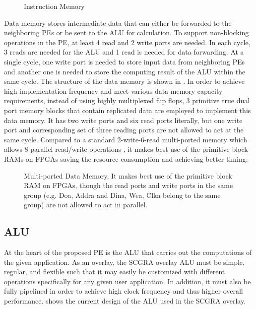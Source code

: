 \begin{figure}
\caption{Instruction Memory}
\label{fig:inst-rom}
\end{figure}

Data memory stores intermediate data that can either be forwarded to the neighboring PEs or be sent to the ALU for calculation. To support non-blocking operations in the PE, at least 4 read and 2 write ports are needed. In each cycle, 3 reads are needed for the ALU and 1 read is needed for data forwarding. At a single cycle, one write port is needed to store input data from neighboring PEs and another one is needed to store the computing result of the ALU within the same cycle. The structure of the data memory is shown in . In order to achieve high implementation frequency and meet various data memory capacity requirements, instead of using highly multiplexed flip flops, 3 primitive true dual port memory blocks that contain replicated data are employed to implement this data memory. It has two write ports and six read ports literally, but one write port and corresponding set of three reading ports are not allowed to act at the same cycle. Compared to a standard 2-write-6-read multi-ported memory which allows 8 parallel read/write operations \cite{abdelhadi2014modular}, it makes best use of the primitive block RAMs on FPGAs saving the resource consumption and achieving better timing. 

\begin{figure}
\caption{Multi-ported Data Memory, It makes best use of the primitive block RAM on FPGAs, though the read ports and write ports in the same group (e.g. Doa, Addra and Dina, Wea, Clka belong to the same group) are not allowed to act in parallel.}
\label{fig:data-mem}
\end{figure}

\subsection{ALU}
At the heart of the proposed PE is the ALU that carries out the computations of the given application.  As an overlay, the SCGRA overlay ALU must be simple, regular, and flexible such that it may easily be customized with different operations specifically for any given user application.  In addition, it must also be fully pipelined in order to achieve high clock frequency and thus higher overall performance.  shows the current design of the ALU used in the SCGRA overlay.


